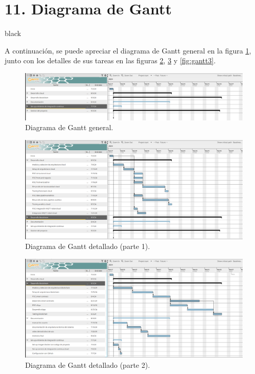 \documentclass[
11pt, %
]{charter}
\begin{document}
\section{11. Diagrama de Gantt}
\label{sec:gantt}


\begin{consigna}{black}

A continuación, se puede apreciar el diagrama de Gantt general en la figura \ref{fig:gantt0}, junto con los detalles de sus tareas en las figuras \ref{fig:gantt1}, \ref{fig:gantt2} y \ref{fig:gantt3}.

\begin{figure}[htpb]
\centering
\includegraphics[width=1\textwidth]{./Figuras/gantt-0}
\caption{Diagrama de Gantt general.}
\label{fig:gantt0}
\end{figure}

\begin{figure}[htpb]
\centering
\includegraphics[width=1\textwidth]{./Figuras/gantt-1}
\caption{Diagrama de Gantt detallado (parte 1).}
\label{fig:gantt1}
\end{figure}

\begin{figure}[htpb]
\centering
\includegraphics[width=1\textwidth]{./Figuras/gantt-2}
\caption{Diagrama de Gantt detallado (parte 2).}
\label{fig:gantt2}
\end{figure}


\end{consigna}
\end{document}
